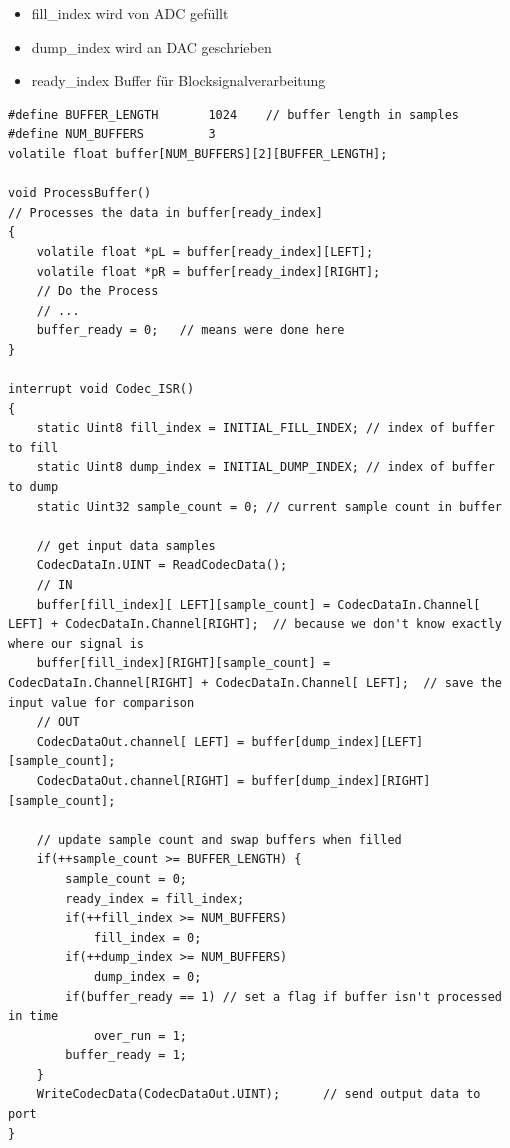 \documentclass[10pt,a4paper]{article}
\begin{document}
\begin{itemize}
    \item fill\_index wird von ADC gefüllt
    \item dump\_index wird an DAC geschrieben
    \item ready\_index Buffer für Blocksignalverarbeitung
\end{itemize}

\begin{verbatim}
#define BUFFER_LENGTH   	1024	// buffer length in samples 
#define NUM_BUFFERS         3
volatile float buffer[NUM_BUFFERS][2][BUFFER_LENGTH];

void ProcessBuffer()
// Processes the data in buffer[ready_index]
{
    volatile float *pL = buffer[ready_index][LEFT];
    volatile float *pR = buffer[ready_index][RIGHT];
    // Do the Process
    // ...
    buffer_ready = 0;   // means were done here
}

interrupt void Codec_ISR()
{                    
    static Uint8 fill_index = INITIAL_FILL_INDEX; // index of buffer to fill
    static Uint8 dump_index = INITIAL_DUMP_INDEX; // index of buffer to dump
    static Uint32 sample_count = 0; // current sample count in buffer

    // get input data samples
  	CodecDataIn.UINT = ReadCodecData();		
  	// IN
    buffer[fill_index][ LEFT][sample_count] = CodecDataIn.Channel[ LEFT] + CodecDataIn.Channel[RIGHT];  // because we don't know exactly where our signal is
    buffer[fill_index][RIGHT][sample_count] = CodecDataIn.Channel[RIGHT] + CodecDataIn.Channel[ LEFT];  // save the input value for comparison
  	// OUT
    CodecDataOut.channel[ LEFT] = buffer[dump_index][LEFT][sample_count];
    CodecDataOut.channel[RIGHT] = buffer[dump_index][RIGHT][sample_count];

    // update sample count and swap buffers when filled 
    if(++sample_count >= BUFFER_LENGTH) {
        sample_count = 0;
        ready_index = fill_index;
        if(++fill_index >= NUM_BUFFERS)
            fill_index = 0;
        if(++dump_index >= NUM_BUFFERS)
            dump_index = 0;
        if(buffer_ready == 1) // set a flag if buffer isn't processed in time 
            over_run = 1;
        buffer_ready = 1;
    }
	WriteCodecData(CodecDataOut.UINT);		// send output data to  port
}
\end{verbatim}
\end{document}
